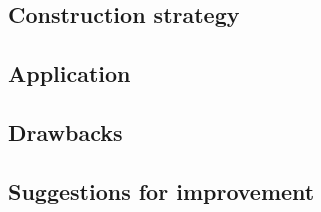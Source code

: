\subsection{Construction strategy}

\subsection{Application}

\subsection{Drawbacks}

\subsection{Suggestions for improvement}

